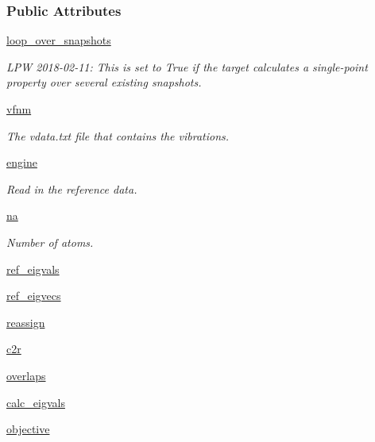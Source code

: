 \subsubsection*{Public Attributes}
\begin{DoxyCompactItemize}
\item 
\hyperlink{classsrc_1_1vibration_1_1Vibration_a9550e67b0f5a4293a3b77dd4ff34945f}{loop\+\_\+over\+\_\+snapshots}
\begin{DoxyCompactList}\small\item\em L\+PW 2018-\/02-\/11\+: This is set to True if the target calculates a single-\/point property over several existing snapshots. \end{DoxyCompactList}\item 
\hyperlink{classsrc_1_1vibration_1_1Vibration_a60cba0b90b62589d1b1f35a0f5f999d5}{vfnm}
\begin{DoxyCompactList}\small\item\em The vdata.\+txt file that contains the vibrations. \end{DoxyCompactList}\item 
\hyperlink{classsrc_1_1vibration_1_1Vibration_adb69becc218ed026150e7de7b06d7134}{engine}
\begin{DoxyCompactList}\small\item\em Read in the reference data. \end{DoxyCompactList}\item 
\hyperlink{classsrc_1_1vibration_1_1Vibration_a7ecc404f51442afb3cd0e4e4b15967dd}{na}
\begin{DoxyCompactList}\small\item\em Number of atoms. \end{DoxyCompactList}\item 
\hyperlink{classsrc_1_1vibration_1_1Vibration_a914808ec757925eedf7167114d87b3bb}{ref\+\_\+eigvals}
\item 
\hyperlink{classsrc_1_1vibration_1_1Vibration_a3b72a781b0fa1b08f9f6d8d5e345cc04}{ref\+\_\+eigvecs}
\item 
\hyperlink{classsrc_1_1vibration_1_1Vibration_a2c93d67c9bb6ac55094159ee85b12442}{reassign}
\item 
\hyperlink{classsrc_1_1vibration_1_1Vibration_a0cf6ea114a083a6d6dae49454465594e}{c2r}
\item 
\hyperlink{classsrc_1_1vibration_1_1Vibration_af76259c44c5a83bfba233c90cb22fd12}{overlaps}
\item 
\hyperlink{classsrc_1_1vibration_1_1Vibration_a223ca8d13062917e5166415e624a5ae3}{calc\+\_\+eigvals}
\item 
\hyperlink{classsrc_1_1vibration_1_1Vibration_a9ce5c92b056995dc03653a5c4f590fbf}{objective}
\end{DoxyCompactItemize}


